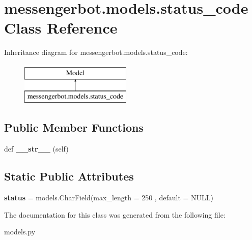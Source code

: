 \hypertarget{classmessengerbot_1_1models_1_1status__code}{}\section{messengerbot.\+models.\+status\+\_\+code Class Reference}
\label{classmessengerbot_1_1models_1_1status__code}
Inheritance diagram for messengerbot.\+models.\+status\+\_\+code\+:\begin{figure}[H]
\begin{center}
\leavevmode
\includegraphics[height=2.000000cm]{classmessengerbot_1_1models_1_1status__code}
\end{center}
\end{figure}
\subsection*{Public Member Functions}
\begin{DoxyCompactItemize}
\item 
\mbox{\label{classmessengerbot_1_1models_1_1status__code_a26cab58d40b51e434242f6a324e0247c}} 
def {\bfseries \+\_\+\+\_\+str\+\_\+\+\_\+} (self)
\end{DoxyCompactItemize}
\subsection*{Static Public Attributes}
\begin{DoxyCompactItemize}
\item 
\mbox{\label{classmessengerbot_1_1models_1_1status__code_a61285a10b7a60b3a8f87504194bea9f5}} 
{\bfseries status} = models.\+Char\+Field(max\+\_\+length = 250 , default = \textquotesingle{}N\+U\+LL\textquotesingle{})
\end{DoxyCompactItemize}


The documentation for this class was generated from the following file\+:\begin{DoxyCompactItemize}
\item 
models.\+py\end{DoxyCompactItemize}
